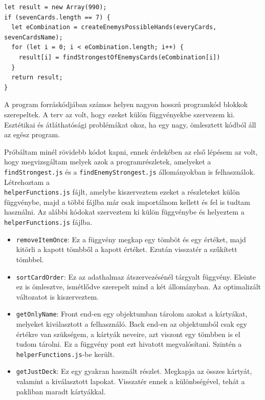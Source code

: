 \newpage

\begin{lstlisting}[style=htmlcssjs]
let result = new Array(990);
if (sevenCards.length == 7) {
  let eCombination = createEnemysPossibleHands(everyCards, sevenCardsName);
  for (let i = 0; i < eCombination.length; i++) {
    result[i] = findStrongestOfEnemysCards(eCombination[i])
  }
  return result;
}
\end{lstlisting}


A program forráskódjában számos helyen nagyon hosszú programkód blokkok szerepeltek. A terv az volt, hogy ezeket külön függvényekbe szervezem ki. Esztétikai és átláthatósági problémákat okoz, ha egy nagy, ömlesztett kódból áll az egész program.

Próbáltam minél rövidebb kódot kapni, ennek érdekében az első lépésem az volt, hogy megvizsgáltam melyek azok a programrészletek, amelyeket a \texttt{findStrongest.js} és a \texttt{findEnemyStrongest.js} állományokban is felhasználok. Létrehoztam a \\ \texttt{helperFunctions.js} fájlt, amelybe kiszerveztem ezeket a részleteket külön függvénybe, majd a többi fájlba már csak importálnom kellett és fel is tudtam használni. Az alábbi kódokat szerveztem ki külön függvénybe és helyeztem a \texttt{helperFunctions.js} fájlba.
\begin{itemize}
    \item \texttt{removeItemOnce}: Ez a függvény megkap egy tömböt és egy értéket, majd kitörli a kapott tömbből a kapott értéket. Ezután visszatér a szűkített tömbbel.
    \item \texttt{sortCardOrder}: Ez az adathalmaz átszervezésénél tárgyalt függvény. Eleinte ez is ömlesztve, ismétlődve szerepelt mind a két állományban. Az optimalizált változatot is kiszerveztem.
    \item \texttt{getOnlyName}: Front end-en egy objektumban tárolom azokat a kártyákat, melyeket kiválasztott a felhasználó. Back end-en az objektumból csak egy értékre van szükségem, a kártyák neveire, azt viszont egy tömbben is el tudom tárolni. Ez a függvény pont ezt hivatott megvalósítani. Szintén a \texttt{helperFunctions.js}-be került.
    \item \texttt{getJustDeck}: Ez egy gyakran használt részlet. Megkapja az összes kártyát, valamint a kiválasztott lapokat. Visszatér ennek a különbségével, tehát a pakliban maradt kártyákkal.
\end{itemize}

